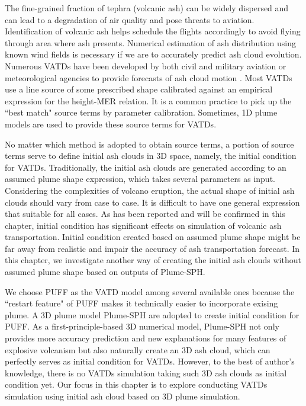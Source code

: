 The fine-grained fraction of tephra (volcanic ash) can be widely dispersed and can lead to a degradation of air quality and pose threats to aviation. Identification of volcanic ash helps schedule the flights accordingly to avoid flying through area where ash presents. Numerical estimation of ash distribution using known wind fields is necessary if we are to accurately predict ash cloud evolution. Numerous VATDs have been developed by both civil and military aviation or meteorological agencies to provide forecasts of ash cloud motion \citep{witham2007comparison}. Most VATDs use a line source of some prescribed shape calibrated against an empirical expression for the height-MER relation. It is a common practice to pick up the ``best match" source terms by parameter calibration. Sometimes, 1D plume models are used to provide these source terms for VATDs.

No matter which method is adopted to obtain source terms, a portion of source terms serve to define initial ash clouds in 3D space, namely, the initial condition for VATDs. Traditionally, the initial ash clouds are generated according to an assumed plume shape expression, which takes several parameters as input. Considering the complexities of volcano eruption, the actual shape of initial ash clouds should vary from case to case. It is difficult to have one general expression that suitable for all cases. As has been reported and will be confirmed in this chapter, initial condition has significant effects on simulation of volcanic ash transportation. Initial condition created based on assumed plume shape might be far away from realistic and impair the accuracy of ash transportation forecast. In this chapter, we investigate another way of creating the initial ash clouds without assumed plume shape based on outputs of Plume-SPH.

We choose PUFF \citep{searcy1998puff} as the VATD model among several available ones \citep[e.g.][]{searcy1998puff,schwaiger2012ash3d} because the ``restart feature" of PUFF makes it technically easier to incorporate exising plume. A 
3D plume model Plume-SPH \citep{gmd-2017-119} are adopted to create initial condition for PUFF. As a first-principle-based 3D numerical model, Plume-SPH not only provides more accuracy prediction and new explanations for many features of explosive volcanism but also naturally create an 3D ash cloud, which can perfectly serves as initial condition for VATDs. However, to the best of author's knowledge, there is no VATDs simulation taking such 3D ash clouds as initial condition yet. Our focus in this chapter is to explore conducting VATDs simulation using initial ash cloud based on 3D plume simulation.

